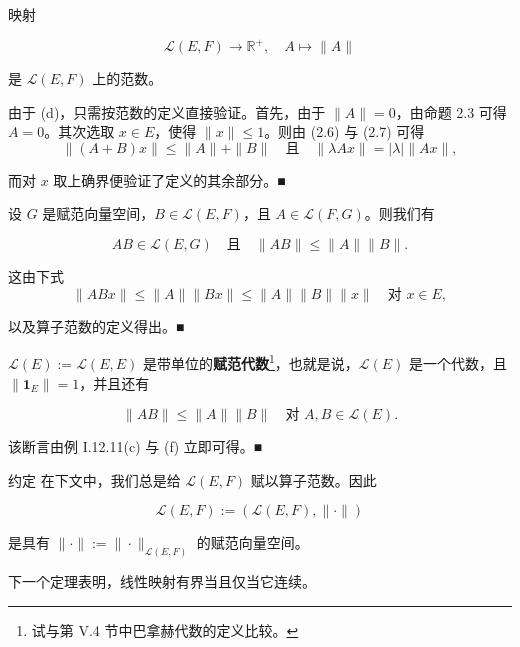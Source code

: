 \begin{conclusion}
\begin{items}
\item

映射

\[
\mathcal{L}(E, F) \to \mathbb{R}^+, \quad A \mapsto \|A\|
\]

是 $ \mathcal{L}(E, F) $ 上的范数。

\proofhead
由于 (d)，只需按范数的定义直接验证。首先，由于 $ \|A\| = 0 $，由命题 2.3 可得 $ A = 0 $。其次选取 $ x \in E $，使得 $ \|x\| \le 1 $。则由 (2.6) 与 (2.7) 可得
\[
\|(A + B)x\| \le \|A\| + \|B\| \quad \text{且} \quad \|\lambda Ax\| = |\lambda| \|Ax\|,
\]

而对 $ x $ 取上确界便验证了定义的其余部分。\nobreak\hspace{0.35em}■

\item

设 $ G $ 是赋范向量空间，$ B \in \mathcal{L}(E, F) $，且 $ A \in \mathcal{L}(F, G) $。则我们有

\[
AB \in \mathcal{L}(E, G) \quad \text{且} \quad \|AB\| \le \|A\| \|B\|.
\]

\proofhead
这由下式
\[
\|ABx\| \le \|A\| \|Bx\| \le \|A\| \|B\| \|x\| \quad \text{对 } x \in E,
\]

以及算子范数的定义得出。\nobreak\hspace{0.35em}■

\item

$ \mathcal{L}(E) := \mathcal{L}(E, E) $ 是带单位的\textbf{赋范代数}\footnote{试与第 V.4 节中巴拿赫代数的定义比较。}，也就是说，$ \mathcal{L}(E) $ 是一个代数，且 $ \|\mathbf{1}_E\| = 1 $，并且还有

\[
\|AB\| \le \|A\| \|B\| \quad \text{对 } A, B \in \mathcal{L}(E).
\]

\proofhead
该断言由例 I.12.11(c) 与 (f) 立即可得。\nobreak\hspace{0.35em}■
\end{items}

约定 在下文中，我们总是给 $ \mathcal{L}(E, F) $ 赋以算子范数。因此

\[
\mathcal{L}(E, F) := (\mathcal{L}(E, F), \|\cdot\|)
\]

是具有 $ \|\cdot\| := \|\cdot\|_{\mathcal{L}(E, F)} $ 的赋范向量空间。

下一个定理表明，线性映射有界当且仅当它连续。

\end{conclusion}

